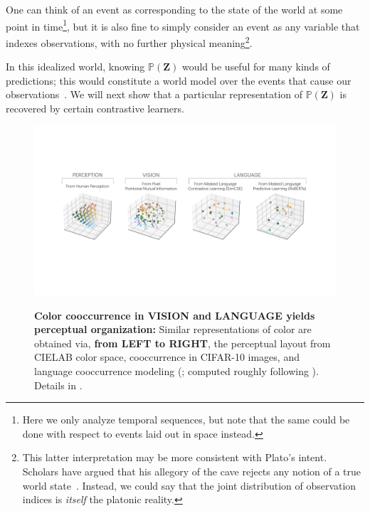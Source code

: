 \documentclass{article}
\newcommand{\fixme}[1]{{\bf\color{red}FIXME: #1}}
\theoremstyle{plain}
\theoremstyle{definition}
\theoremstyle{remark}
\begin{document}
One can think of an event as corresponding to the state of the world at some point in time\footnote{Here we only analyze temporal sequences, but note that the same could be done with respect to events laid out in space instead.}, but it is also fine to simply consider an event as any variable that indexes observations, with no further physical meaning\footnote{This latter interpretation may be more consistent with Plato's intent. Scholars have argued that his allegory of the cave rejects any notion of a true world state~\cite{nettleship1897lecturesplato}. Instead, we could say that the joint distribution of observation indices is \textit{itself} the platonic reality.}. %

In this idealized world, knowing $\mathbb{P}(\mathbf{Z})$ would be useful for many kinds of predictions; this would constitute a world model over the events that cause our observations~\citep{werbos1987learning,ha2018world,richens2024robust}. We will next show that a particular representation of $\mathbb{P}(\mathbf{Z})$ is recovered by certain contrastive learners.

\begin{figure}[ht]
    \centering
    \includegraphics[width=0.99\linewidth,trim=174 352 188 295,clip]{figures/color_convergence.pdf}\\[-5pt]
    \caption{\small\textbf{Color cooccurrence in VISION and LANGUAGE yields perceptual organization:} Similar representations of color are obtained via, \textbf{from LEFT to RIGHT}, the perceptual layout from CIELAB color space,  cooccurrence in CIFAR-10 images, and language cooccurrence modeling (\citet{gao2021simcse,liu2019roberta}; computed roughly following \citet{abdou2021can}). Details in .
    }
    \label{fig:color_pAB}
\end{figure}
\end{document}
